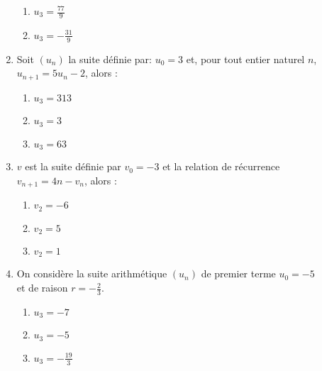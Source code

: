 \documentclass[oneside,twocolumn,landscape]{book}
\begin{document}
\begin{enumerate}
\begin{enumerate}
\item\MauvaiseReponse $u_{3} =\frac{77}{9}$

\item\BonneReponse $u_{3}=-\frac{31}{9}$

\end{enumerate}


\item Soit $\left(u_{n}\right)$ la suite définie par: $u_{0}=3$ et, pour tout entier naturel $n$, $u_{n+1}=5 u_{n}-2$, alors :

\begin{enumerate}

\item\BonneReponse $u_{3}=313$

\item\MauvaiseReponse $u_{3}=3$

\item\MauvaiseReponse $u_{3}=63$


\end{enumerate}

\newpage

\item $v$ est la suite définie par $v_{0}=-3$ et la relation de récurrence\\ $v_{n+1}=4n-v_{n}$, alors :

\begin{enumerate}


\item\MauvaiseReponse $v_{2}=-6$

\item\MauvaiseReponse $v_{2}=5$

\item\BonneReponse $v_{2}=1$

\end{enumerate}



\item On considère la suite arithmétique $\left(u_{n}\right)$ de premier terme $u_{0}=-5$\\ et de raison $r=-\frac{2}{3}$.

\begin{enumerate}

\item\BonneReponse $u_{3}=-7$

\item\MauvaiseReponse $u_{3}=-5$

\item\MauvaiseReponse $u_{3}=-\frac{19}{3}$



\end{enumerate}
\end{enumerate}
\end{document}
